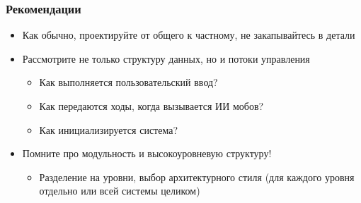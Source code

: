 \documentclass[xetex,mathserif,serif]{beamer}
\begin{document}
    \begin{frame}
        \frametitle{Рекомендации}
        \begin{itemize}
            \item Как обычно, проектируйте от общего к частному, не закапывайтесь в детали
            \item Рассмотрите не только структуру данных, но и потоки управления
            \begin{itemize}
                \item Как выполняется пользовательский ввод?
                \item Как передаются ходы, когда вызывается ИИ мобов?
                \item Как инициализируется система?
            \end{itemize}
            \item Помните про модульность и высокоуровневую структуру!
            \begin{itemize}
                \item Разделение на уровни, выбор архитектурного стиля (для каждого уровня отдельно или всей системы целиком)
            \end{itemize}
        \end{itemize}
    \end{frame}
\end{document}
